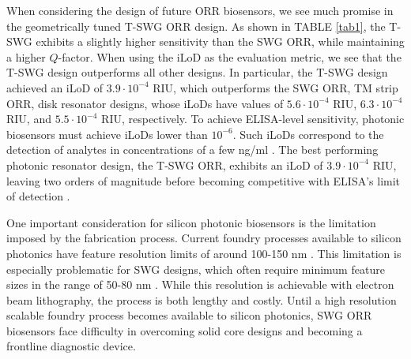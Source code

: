 \documentclass[aps,prl,twocolumn, superscriptaddress,nobalancelastpage]{revtex4}
\begin{document}
When considering the design of future ORR biosensors, we see much promise in the geometrically tuned T-SWG ORR design. As shown in TABLE \ref{tab1}, the T-SWG exhibits a slightly higher sensitivity than the SWG ORR, while maintaining a higher $Q$-factor. When using the iLoD as the evaluation metric, we see that the T-SWG design outperforms all other designs. In particular, the T-SWG design \cite{TSWGbio} achieved an iLoD of $3.9\cdot 10^{-4}$ RIU, which outperforms the SWG ORR, TM strip ORR, disk resonator designs, whose iLoDs have values of $5.6 \cdot 10^{-4}$ RIU, $6.3\cdot 10^{-4}$ RIU, and $5.5 \cdot 10^{-4}$ RIU, respectively. To achieve ELISA-level sensitivity, photonic biosensors must achieve iLoDs lower than $10^{-6}$. Such iLoDs correspond to the detection of analytes in concentrations of a few ng/ml \cite{LoDPhotonicBiosensors}. The best performing photonic resonator design, the T-SWG ORR, exhibits an iLoD of $3.9 \cdot 10^{-4}$ RIU, leaving two orders of magnitude before becoming competitive with ELISA's limit of detection \cite{ELISAlimit}.



One important consideration for silicon photonic biosensors is the limitation imposed by the fabrication process. Current foundry processes available to silicon photonics have feature resolution limits of around 100-150 nm \cite{cmos}. This limitation is especially problematic for SWG designs, which often require minimum feature sizes in the range of 50-80 nm \cite{swg1}. While this resolution is achievable with electron beam lithography, the process is both lengthy and costly. Until a high resolution scalable foundry process becomes available to silicon photonics, SWG ORR biosensors face difficulty in overcoming solid core designs and becoming a frontline diagnostic device. 
\end{document}
